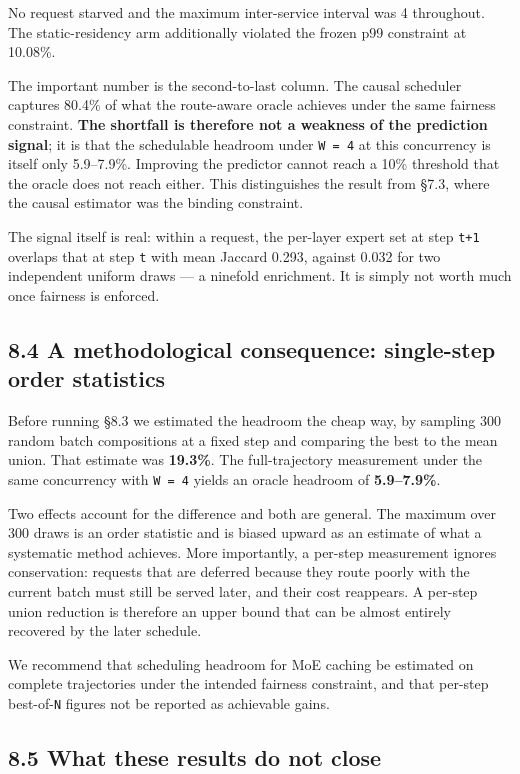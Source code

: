 \documentclass[
  10pt,
  letterpaper,
  10pt]{article}
\begin{document}
No request starved and the maximum inter-service interval was 4
throughout. The static-residency arm additionally violated the frozen
p99 constraint at 10.08\%.

The important number is the second-to-last column. The causal scheduler
captures 80.4\% of what the route-aware oracle achieves under the same
fairness constraint. \textbf{The shortfall is therefore not a weakness
of the prediction signal}; it is that the schedulable headroom under
\texttt{W\ =\ 4} at this concurrency is itself only 5.9--7.9\%.
Improving the predictor cannot reach a 10\% threshold that the oracle
does not reach either. This distinguishes the result from §7.3, where
the causal estimator was the binding constraint.

The signal itself is real: within a request, the per-layer expert set at
step \texttt{t+1} overlaps that at step \texttt{t} with mean Jaccard
0.293, against 0.032 for two independent uniform draws --- a ninefold
enrichment. It is simply not worth much once fairness is enforced.

\subsection{8.4 A methodological consequence: single-step order
statistics}\label{a-methodological-consequence-single-step-order-statistics}

Before running §8.3 we estimated the headroom the cheap way, by sampling
300 random batch compositions at a fixed step and comparing the best to
the mean union. That estimate was \textbf{19.3\%}. The full-trajectory
measurement under the same concurrency with \texttt{W\ =\ 4} yields an
oracle headroom of \textbf{5.9--7.9\%}.

Two effects account for the difference and both are general. The maximum
over 300 draws is an order statistic and is biased upward as an estimate
of what a systematic method achieves. More importantly, a per-step
measurement ignores conservation: requests that are deferred because
they route poorly with the current batch must still be served later, and
their cost reappears. A per-step union reduction is therefore an upper
bound that can be almost entirely recovered by the later schedule.

We recommend that scheduling headroom for MoE caching be estimated on
complete trajectories under the intended fairness constraint, and that
per-step best-of-\texttt{N} figures not be reported as achievable gains.

\subsection{8.5 What these results do not
close}\label{what-these-results-do-not-close}
\end{document}
